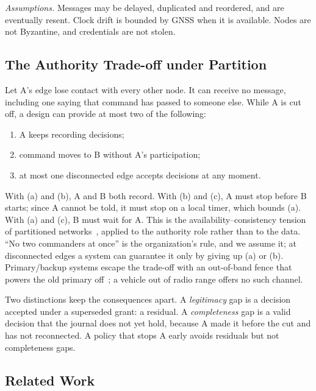 \textit{Assumptions.} Messages may be delayed, duplicated and reordered, and are
eventually resent. Clock drift is bounded by GNSS when it is available. Nodes are not
Byzantine, and credentials are not stolen.

\subsection{The Authority Trade-off under Partition}
\label{sec:tradeoff}

Let A's edge lose contact with every other node. It can receive no message, including one
saying that command has passed to someone else. While A is cut off, a design can provide
at most two of the following:
\begin{enumerate}[label=(\alph*)]
  \item A keeps recording decisions;
  \item command moves to B without A's participation;
  \item at most one disconnected edge accepts decisions at any moment.
\end{enumerate}
With (a) and (b), A and B both record. With (b) and (c), A must stop before B starts;
since A cannot be told, it must stop on a local timer, which bounds (a). With (a) and
(c), B must wait for A. This is the availability--consistency tension of partitioned
networks~\cite{davidson1985consistency,gilbert2002cap}, applied to the authority role rather
than to the data. ``No two commanders at once'' is the organization's rule, and we assume
it; at disconnected edges a system can guarantee it only by giving up (a) or (b).
Primary/backup systems escape the trade-off with an out-of-band fence that powers the old
primary off~\cite{kleppmann2017ddia}; a vehicle out of radio range offers no such channel.

Two distinctions keep the consequences apart. A \emph{legitimacy} gap is a decision
accepted under a superseded grant: a residual. A \emph{completeness} gap is a valid
decision that the journal does not yet hold, because A made it before the cut and has not
reconnected. A policy that stops A early avoids residuals but not completeness gaps.


\subsection{Related Work}
\label{sec:positioning}

